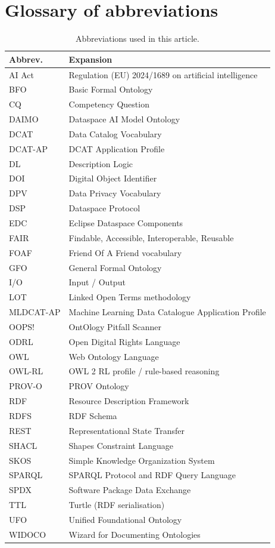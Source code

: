 \documentclass[Afour,sagev,times]{sagej}
\begin{document}
\section{Glossary of abbreviations}\label{app:glossary}

\begin{table}[t]
\small\sf\centering
\caption{Abbreviations used in this article.\label{tab:glossary}}
\begin{tabular}{@{}p{2.2cm}p{10cm}@{}}
\toprule
\textbf{Abbrev.} & \textbf{Expansion} \\
\midrule
AI Act & Regulation (EU) 2024/1689 on artificial intelligence \\
BFO & Basic Formal Ontology \\
CQ & Competency Question \\
DAIMO & Dataspace AI Model Ontology \\
DCAT & Data Catalog Vocabulary \\
DCAT-AP & DCAT Application Profile \\
DL & Description Logic \\
DOI & Digital Object Identifier \\
DPV & Data Privacy Vocabulary \\
DSP & Dataspace Protocol \\
EDC & Eclipse Dataspace Components \\
FAIR & Findable, Accessible, Interoperable, Reusable \\
FOAF & Friend Of A Friend vocabulary \\
GFO & General Formal Ontology \\
I/O & Input / Output \\
LOT & Linked Open Terms methodology \\
MLDCAT-AP & Machine Learning Data Catalogue Application Profile \\
OOPS! & OntOlogy Pitfall Scanner \\
ODRL & Open Digital Rights Language \\
OWL & Web Ontology Language \\
OWL-RL & OWL 2 RL profile / rule-based reasoning \\
PROV-O & PROV Ontology \\
RDF & Resource Description Framework \\
RDFS & RDF Schema \\
REST & Representational State Transfer \\
SHACL & Shapes Constraint Language \\
SKOS & Simple Knowledge Organization System \\
SPARQL & SPARQL Protocol and RDF Query Language \\
SPDX & Software Package Data Exchange \\
TTL & Turtle (RDF serialisation) \\
UFO & Unified Foundational Ontology \\
WIDOCO & Wizard for Documenting Ontologies \\
\bottomrule
\end{tabular}
\end{table}
\end{document}
